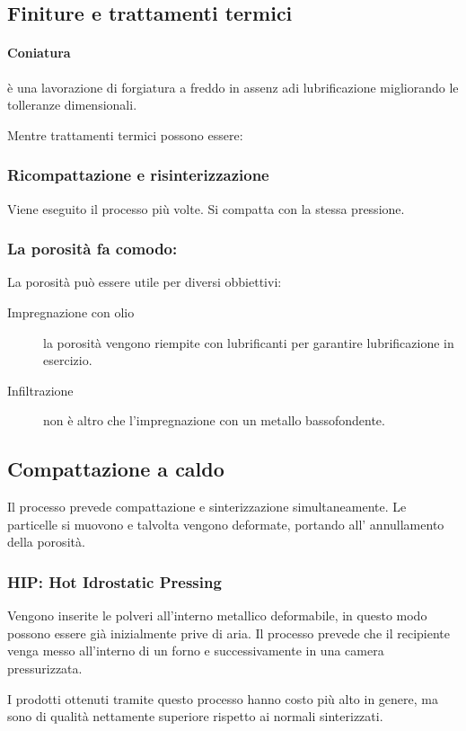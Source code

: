 \subsection{Finiture e trattamenti termici}
\paragraph{Coniatura} è una lavorazione di forgiatura a freddo in assenz adi lubrificazione migliorando le tolleranze dimensionali.

Mentre trattamenti termici possono essere:
\subsubsection{Ricompattazione e risinterizzazione} Viene eseguito il processo più volte. Si compatta con la stessa pressione.

\subsubsection{La porosità fa comodo:}
La porosità può essere utile per diversi obbiettivi:
\begin{description}
\item[Impregnazione con olio] la porosità vengono riempite con lubrificanti per garantire lubrificazione in esercizio.
\item[Infiltrazione] non è altro che l'impregnazione con un metallo bassofondente.
\end{description}

\subsection{Compattazione a caldo}
Il processo prevede compattazione e sinterizzazione simultaneamente.
Le particelle si muovono e talvolta vengono deformate, portando all' annullamento della porosità.

\subsubsection{HIP: Hot Idrostatic Pressing}
Vengono inserite le polveri all'interno metallico deformabile, in questo modo possono essere già inizialmente  prive di aria.
Il processo prevede che il recipiente venga messo all'interno di un forno e successivamente in una camera pressurizzata.

I prodotti ottenuti tramite questo processo hanno costo più alto in genere, ma sono di qualità nettamente superiore rispetto ai normali sinterizzati.

